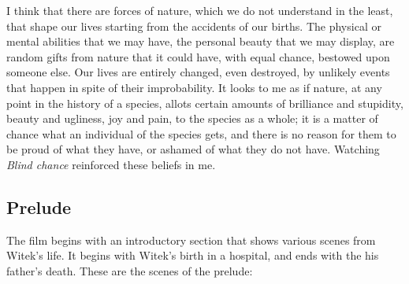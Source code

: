 \documentclass{article}
\begin{document}
I think that there are forces of nature, which we do not understand in
the least, that shape our lives starting from the accidents of our
births.  The physical or mental abilities that we may have, the
personal beauty that we may display, are random gifts from nature that
it could have, with equal chance, bestowed upon someone else.  Our
lives are entirely changed, even destroyed, by unlikely events that
happen in spite of their improbability.  It looks to me as if nature,
at any point in the history of a species, allots certain amounts of
brilliance and stupidity, beauty and ugliness, joy and pain, to the
species as a whole; it is a matter of chance what an individual of the
species gets, and there is no reason for them to be proud of what they
have, or ashamed of what they do not have.  Watching \emph{Blind
  chance} reinforced these beliefs in me.

\subsection{Prelude}
\label{sec:p9c5o4iz}

The film begins with an introductory section that shows various scenes
from Witek's life.  It begins with Witek's birth in a hospital, and
ends with the his father's death.  These are the scenes of the
prelude:
\end{document}

